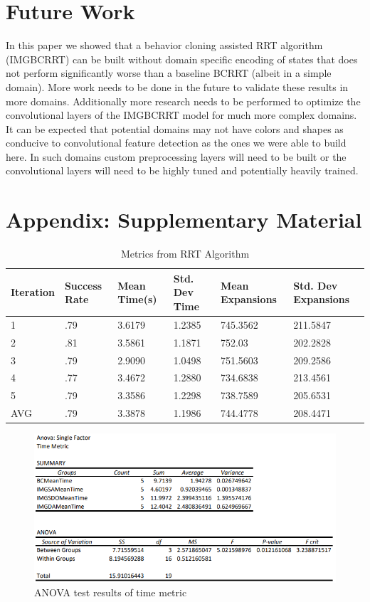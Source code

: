 \documentclass{article}
\begin{document}
\section{Future Work}
In this paper we showed that a behavior cloning assisted RRT algorithm (IMGBCRRT) can be built without domain specific encoding of states that does not perform significantly worse than a baseline BCRRT (albeit in a simple domain). More work needs to be done in the future to validate these results in more domains. Additionally more research needs to be performed to optimize the convolutional layers of the IMGBCRRT model for much more complex domains. It can be expected that potential domains may not have colors and shapes as conducive to convolutional feature detection as the ones we were able to build here. In such domains custom preprocessing layers will need to be built or the convolutional layers will need to be highly tuned and potentially heavily trained. 






\appendix
\section{Appendix: Supplementary Material}

\begin{table}[h]
  \caption{Metrics from RRT Algorithm}
  \label{RRT Metrics}
  \centering
  \begin{tabular}{llllll}
    \cmidrule(r){1-6}
   Iteration & Success Rate & Mean Time(s) & Std. Dev Time & Mean Expansions & Std. Dev Expansions\\
    \midrule
    1 & .79 & 3.6179 & 1.2385 & 745.3562 & 211.5847 \\
    2 & .81 & 3.5861 & 1.1871 & 752.03 & 202.2828 \\
    3 & .79 & 2.9090 & 1.0498 & 751.5603 & 209.2586 \\
    4 & .77 & 3.4672 & 1.2880 & 734.6838 & 213.4561 \\
    5 & .79 & 3.3586 & 1.2298 & 738.7589 & 205.6531 \\
 \midrule
  AVG & .79 & 3.3878 & 1.1986 & 744.4778 & 208.4471 \\
    \bottomrule
  \end{tabular}
\end{table}

\begin{figure}[h]
	\centerline{\includegraphics[scale=0.7]{TTG ANOVA.png}}
        \caption{ANOVA test results of time metric}
\end{figure}
\end{document}
